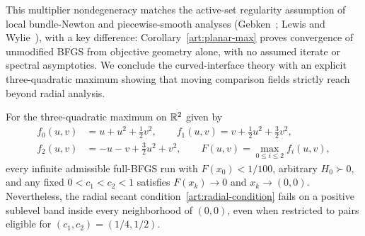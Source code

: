 This multiplier nondegeneracy matches the active-set regularity assumption of
local bundle-Newton and piecewise-smooth analyses (Gebken~\cite{BG}; Lewis and
Wylie~), with a key difference:
Corollary~\ref{art:planar-max} proves convergence of unmodified BFGS from
objective geometry alone, with no assumed iterate or spectral asymptotics. We
conclude the curved-interface theory with an explicit three-quadratic maximum
showing that moving comparison fields strictly reach beyond radial analysis.

\begin{theorem}\label{art:nonradial-example}
For the three-quadratic maximum on $\mathbb R^2$ given by
\[
 \begin{aligned}
 f_0(u,v)&=u+u^2+\tfrac12v^2,\qquad
 f_1(u,v)=v+\tfrac12u^2+\tfrac32v^2,\\
 f_2(u,v)&=-u-v+\tfrac32u^2+v^2,\qquad F(u,v)=\max_{0\le i\le2}f_i(u,v),
 \end{aligned}
\]
every infinite admissible full-BFGS run with $F(x_0)<1/100$, arbitrary
$H_0\succ0$, and any fixed $0<c_1<c_2<1$ satisfies $F(x_k)\to0$ and
$x_k\to(0,0)$. Nevertheless, the radial secant condition~\eqref{art:radial-condition}
fails on a positive sublevel band inside every neighborhood of $(0,0)$, even
when restricted to pairs eligible for $(c_1,c_2)=(1/4,1/2)$.
\end{theorem}

